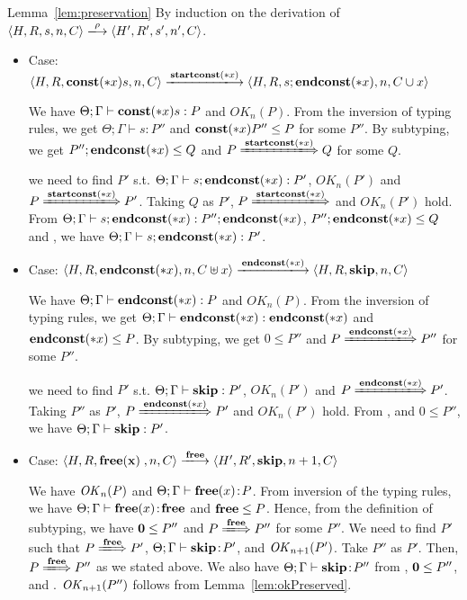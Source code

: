 \begin{pfof}{Lemma~\ref{lem:preservation}}
By induction on the derivation of \(\langle H,R,s,n, C \rangle
\xlongrightarrow{\rho} \langle H',R',s', n', C \rangle\).

\begin{itemize}

\item Case: \( \langle H, R, \scon\Sirx s, n, C \rangle
  \xlongrightarrow{\Startconst} \langle H, R, s;\Endconst, n, C\cup
  {x} \rangle \)

  We have \( \Theta; \Gamma \vdash \mathbf{const}(*x) s:P\) and \( OK_n(P)
  \). From the inversion of typing rules, we get \( \Theta; \Gamma
  \vdash s:P'' \) and \( \mathbf{const}(*x) P'' \le P \) for some \( P''
  \). By subtyping, we get \( P'';\mathbf{endconst}(*x) \le Q \) and \( P
  \xLongrightarrow{\Startconst} Q \) for some \( Q \).

  we need to find \(P'\) s.t. \( \Theta; \Gamma \vdash
  s;\mathbf{endconst}(*x):P'\), \( OK_n(P')\) and \( P
  \xLongrightarrow{\Startconst} P' \). Taking \( Q \) as \( P'\), \( P
  \xLongrightarrow{\Startconst}\) and \( OK_n(P')\) hold. From \(
  \Theta; \Gamma \vdash s;\mathbf{endconst}(*x):P'';\mathbf{endconst}(*x) \), \( P'';\mathbf{endconst}(*x)
  \le Q \) and , we have \( \Theta; \Gamma \vdash
  s;\mathbf{endconst}(*x):P'\).

\item Case: \( \langle H, R, \Endconst, n, C \uplus {x} \rangle
  \xlongrightarrow{\Endconst} \langle H, R, \SKIP, n, C \rangle \)

  We have \( \Theta; \Gamma \vdash \mathbf{endconst}(*x):P\) and \( OK_n(P)
  \). From the inversion of typing rules, we get \( \Theta; \Gamma
  \vdash \mathbf{endconst}(*x):\mathbf{endconst}(*x) \) and \( \mathbf{endconst}(*x) \le P \). By
  subtyping, we get \( 0 \le P'' \) and \( P
  \xLongrightarrow{\Endconst} P'' \) for some \( P'' \).

  we need to find \(P'\) s.t. \( \Theta; \Gamma \vdash
  \mathbf{skip}:P'\), \( OK_n(P')\) and \( P \xLongrightarrow{\Endconst} P'
  \). Taking \( P'' \) as \( P'\), \( P \xLongrightarrow{\Endconst}
  P'\) and \( OK_n(P')\) hold. From ,  and \( 0
  \le P''\), we have \( \Theta; \Gamma \vdash \mathbf{skip}:P'\).

\item Case: \(\langle H, R, \FREE, n, C\rangle \xlongrightarrow{\Free}
  \langle H', R', \SKIP, n + 1, C \rangle \)

We have \(\mathit{OK}_n(P)\) and \(\Theta; \Gamma \vdash \mathbf{free}(x) \!:\! P\).
From inversion of the typing rules, we have \(\Theta; \Gamma \vdash
\mathbf{free}(x) \!:\! \mathbf{free}\) and \(\mathbf{free} \le P\).  Hence, from the definition
of subtyping, we have \(\mathbf{0} \le P''\) and \(P
\xLongrightarrow{\Free} P''\) for some \(P''\).  We need to find
\(P'\) such that \(P \xLongrightarrow{\Free} P'\), \(\Theta; \Gamma
\vdash \mathbf{skip} \!:\! P'\), and \(\mathit{OK}_{n+1}(P')\).  Take \(P''\) as
\(P'\).  Then, \(P \xLongrightarrow{\Free} P''\) as we stated above.
We also have \(\Theta; \Gamma \vdash \mathbf{skip} \!:\! P''\) from
, \(\mathbf{0} \le P''\), and .  \(\mathit{OK}_{n+1}(P'')\)
follows from Lemma~\ref{lem:okPreserved}.


\end{itemize}
\end{pfof}
